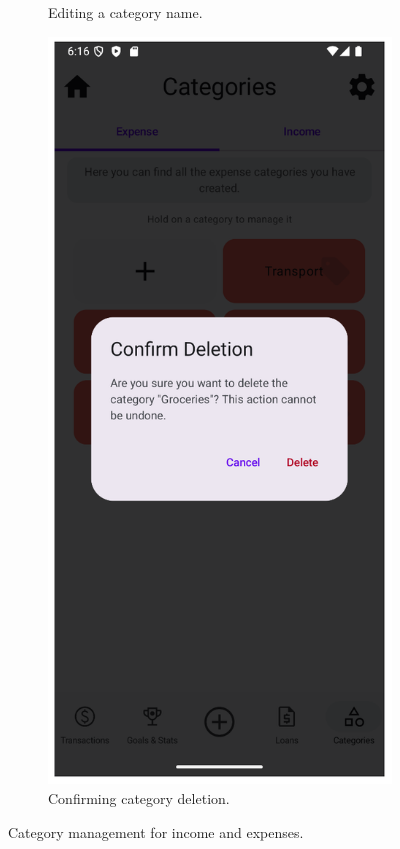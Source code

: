 \documentclass[a4paper,12pt]{article}
\begin{document}
\begin{figure}[H]
\begin{subfigure}[b]{0.23\textwidth}
        \caption{Editing a category name.}
        \label{fig:category_edit_form}
    \end{subfigure}
    \par\bigskip
    \begin{subfigure}[b]{0.23\textwidth}
        \includegraphics[width=\textwidth]{categories_delete_dialog.png}
        \caption{Confirming category deletion.}
        \label{fig:category_delete_confirm}
    \end{subfigure}
    \caption{Category management for income and expenses.}
    \label{fig:category_management}
\end{figure}
\vspace{1cm}
\end{document}
